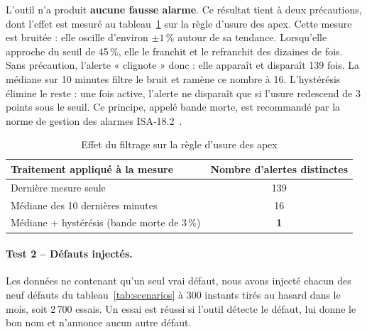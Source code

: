 L'outil n'a produit \textbf{aucune fausse alarme}. Ce résultat tient à deux précautions, dont l'effet est mesuré au tableau~\ref{tab:filtrage} sur la règle d'usure des apex. Cette mesure est bruitée : elle oscille d'environ $\pm 1$\,\% autour de sa tendance. Lorsqu'elle approche du seuil de 45\,\%, elle le franchit et le refranchit des dizaines de fois. Sans précaution, l'alerte « clignote » donc : elle apparaît et disparaît 139 fois. La médiane sur 10 minutes filtre le bruit et ramène ce nombre à 16. L'hystérésis élimine le reste : une fois active, l'alerte ne disparaît que si l'usure redescend de 3 points sous le seuil. Ce principe, appelé bande morte, est recommandé par la norme de gestion des alarmes ISA-18.2~\cite{isa182}.

\begin{table}[H]
\centering
\caption{Effet du filtrage sur la règle d'usure des apex}
\label{tab:filtrage}
\small
\begin{tabular}{lc}
\toprule
\textbf{Traitement appliqué à la mesure} & \textbf{Nombre d'alertes distinctes} \\
\midrule
Dernière mesure seule & 139 \\
Médiane des 10 dernières minutes & 16 \\
Médiane + hystérésis (bande morte de 3\,\%) & \textbf{1} \\
\bottomrule
\end{tabular}
\end{table}

\paragraph{Test 2 -- Défauts injectés.} Les données ne contenant qu'un seul vrai défaut, nous avons injecté chacun des neuf défauts du tableau~\ref{tab:scenarios} à 300 instants tirés au hasard dans le mois, soit 2\,700 essais. Un essai est réussi si l'outil détecte le défaut, lui donne le bon nom et n'annonce aucun autre défaut.

